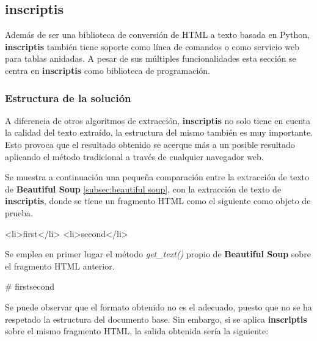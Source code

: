 \subsection{inscriptis}
\label{subsec:inscriptis}

Además de ser una biblioteca de conversión de HTML a texto basada en Python, \textbf{inscriptis} 
\cite{inscriptis} también tiene soporte como línea de comandos o como servicio web para tablas anidadas. 
A pesar de sus múltiples funcionalidades esta sección se centra en \textbf{inscriptis} como biblioteca de 
programación.

\subsubsection{Estructura de la solución}
\label{subsubsec:estructura de la solucion}

A diferencia de otros algoritmos de extracción, \textbf{inscriptis} no solo tiene en cuenta la calidad del 
texto extraído, la estructura del mismo también es muy importante. Esto provoca que el resultado obtenido 
se acerque más a un posible resultado aplicando el método tradicional a través de cualquier navegador web.

Se muestra a continuación una pequeña comparación entre la extracción de texto de \textbf{Beautiful Soup}
\ref{subsec:beautiful soup}, con la extracción de texto de \textbf{inscriptis}, donde se tiene un fragmento 
HTML como el siguiente como objeto de prueba.

\begin{Schunk}
  \begin{Soutput}
      <li>first</li>
      <li>second</li>
  \end{Soutput}
\end{Schunk}

Se emplea en primer lugar el método \emph{get\_text()} propio de \textbf{Beautiful Soup} sobre el fragmento 
HTML anterior.

\begin{Schunk}
  \begin{Soutput}
    # firstsecond
  \end{Soutput}
\end{Schunk}

Se puede observar que el formato obtenido no es el adecuado, puesto que no se ha respetado la estructura
del documento base. Sin embargo, si se aplica \textbf{inscriptis} sobre el mismo fragmento HTML, la salida 
obtenida sería la siguiente:

